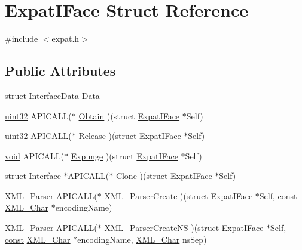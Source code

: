 \hypertarget{struct_expat_i_face}{}\section{Expat\+I\+Face Struct Reference}
\label{struct_expat_i_face}


{\ttfamily \#include $<$expat.\+h$>$}

\subsection*{Public Attributes}
\begin{DoxyCompactItemize}
\item 
struct Interface\+Data \hyperlink{struct_expat_i_face_ac4a9a086c07128cc0ff700ba47364cae}{Data}
\item 
\hyperlink{cppext_8h_a4b435a49c74bb91f284f075e63416cb6}{uint32} A\+P\+I\+C\+A\+LL($\ast$ \hyperlink{struct_expat_i_face_adc41a7b0d1e236eac17441efe961e828}{Obtain} )(struct \hyperlink{struct_expat_i_face}{Expat\+I\+Face} $\ast$Self)
\item 
\hyperlink{cppext_8h_a4b435a49c74bb91f284f075e63416cb6}{uint32} A\+P\+I\+C\+A\+LL($\ast$ \hyperlink{struct_expat_i_face_a82414f33016db74e2706c153435937a6}{Release} )(struct \hyperlink{struct_expat_i_face}{Expat\+I\+Face} $\ast$Self)
\item 
\hyperlink{sound_8c_ae35f5844602719cf66324f4de2a658b3}{void} A\+P\+I\+C\+A\+LL($\ast$ \hyperlink{struct_expat_i_face_af77d6f9e1aa2f909c4277fe5467dbb56}{Expunge} )(struct \hyperlink{struct_expat_i_face}{Expat\+I\+Face} $\ast$Self)
\item 
struct Interface $\ast$A\+P\+I\+C\+A\+LL($\ast$ \hyperlink{struct_expat_i_face_a95b1bd9eddf81ed7a39663ccd1d2d394}{Clone} )(struct \hyperlink{struct_expat_i_face}{Expat\+I\+Face} $\ast$Self)
\item 
\hyperlink{amiga_2include_2libraries_2expat_8h_a9dc0003156857c67b3a60b3993846013}{X\+M\+L\+\_\+\+Parser} A\+P\+I\+C\+A\+LL($\ast$ \hyperlink{struct_expat_i_face_a3cc7fbc45f8a7642201893171489effc}{X\+M\+L\+\_\+\+Parser\+Create} )(struct \hyperlink{struct_expat_i_face}{Expat\+I\+Face} $\ast$Self, \hyperlink{getopt1_8c_a2c212835823e3c54a8ab6d95c652660e}{const} \hyperlink{amiga_2include_2libraries_2expat_8h_a63da96463e775e1ec3a7d1f076208127}{X\+M\+L\+\_\+\+Char} $\ast$encoding\+Name)
\item 
\hyperlink{amiga_2include_2libraries_2expat_8h_a9dc0003156857c67b3a60b3993846013}{X\+M\+L\+\_\+\+Parser} A\+P\+I\+C\+A\+LL($\ast$ \hyperlink{struct_expat_i_face_ad8936cf154ff1dd85b7b1cf1f2877adf}{X\+M\+L\+\_\+\+Parser\+Create\+NS} )(struct \hyperlink{struct_expat_i_face}{Expat\+I\+Face} $\ast$Self, \hyperlink{getopt1_8c_a2c212835823e3c54a8ab6d95c652660e}{const} \hyperlink{amiga_2include_2libraries_2expat_8h_a63da96463e775e1ec3a7d1f076208127}{X\+M\+L\+\_\+\+Char} $\ast$encoding\+Name, \hyperlink{amiga_2include_2libraries_2expat_8h_a63da96463e775e1ec3a7d1f076208127}{X\+M\+L\+\_\+\+Char} ns\+Sep)

\end{DoxyCompactItemize}
